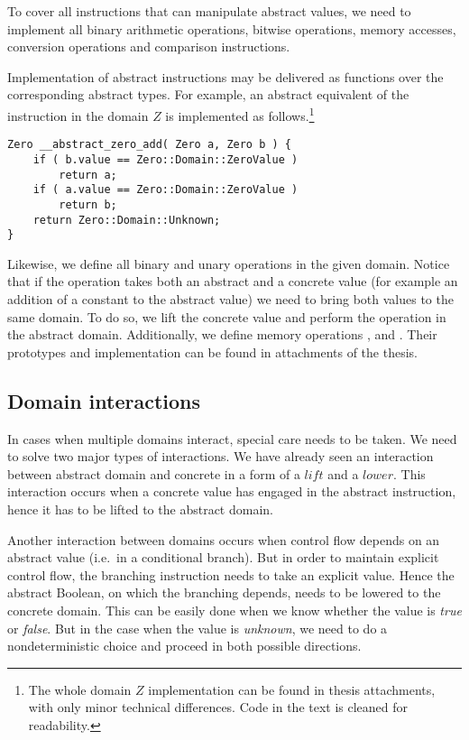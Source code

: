 To cover all \LLVM instructions that can manipulate abstract values, we need to
implement all binary arithmetic operations, bitwise operations, memory
accesses, conversion operations and comparison instructions.

Implementation of abstract instructions may be delivered as \Cpp{} functions over
the corresponding abstract types. For example, an abstract equivalent of the
 instruction in the domain $Z$ is implemented as
follows.\footnote{The whole domain $Z$ implementation can be found in thesis
attachments, with only minor technical differences. Code in the text is cleaned
for readability.}

\begin{verbatim}
Zero __abstract_zero_add( Zero a, Zero b ) {
    if ( b.value == Zero::Domain::ZeroValue )
        return a;
    if ( a.value == Zero::Domain::ZeroValue )
        return b;
    return Zero::Domain::Unknown;
}
\end{verbatim}

Likewise, we define all binary and unary operations in the given domain. Notice
that if the operation takes both an abstract and a concrete value (for example an
addition of a constant to the abstract value) we need to bring both values to the same
domain. To do so, we lift the concrete value and perform the operation in the
abstract domain. Additionally, we define memory operations ,
 and . Their prototypes and implementation can be found
in attachments of the thesis.

\subsection{Domain interactions} \label{sec:interactions}
In cases when multiple domains interact, special care needs to be
taken. We need to solve two major types of interactions.
We have already seen an interaction between abstract domain and concrete in a
form of a $lift$ and a $lower$. This interaction occurs when a concrete value
has engaged in the abstract instruction, hence it has to be lifted to the
abstract domain.

Another interaction between domains occurs when control flow depends on an
abstract value (i.e.~in a conditional branch).  But in order to maintain
explicit control flow, the branching instruction needs to take an explicit
value. Hence the abstract Boolean, on which the branching depends, needs to be
lowered to the concrete domain. This can be easily done when we know whether the
value is \emph{true} or \emph{false}. But in the case when the value is
\emph{unknown}, we need to do a nondeterministic choice and proceed in both
possible directions.

